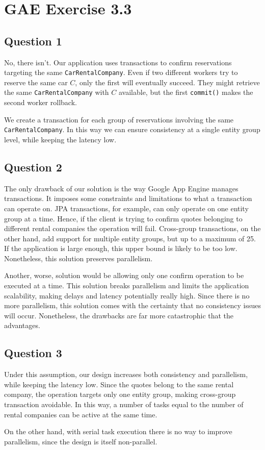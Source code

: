 \section{GAE Exercise 3.3}
\subsection{Question 1}
No, there isn't. Our application uses transactions to confirm reservations targeting the same \texttt{CarRentalCompany}. Even if two different workers try to reserve the same car $C$, only the first will eventually succeed. They might retrieve the same \texttt{CarRentalCompany} with $C$ available, but the first \texttt{commit()} makes the second worker rollback. 

We create a transaction for each group of reservations involving the same \texttt{CarRentalCompany}. In this way we can ensure consistency at a single entity group level, while keeping the latency low.

\subsection{Question 2}
The only drawback of our solution is the way Google App Engine manages transactions. It imposes some constraints and limitations to what a transaction can operate on. JPA transactions, for example, can only operate on one entity group at a time. Hence, if the client is trying to confirm quotes belonging to different rental companies the operation will fail. Cross-group transactions, on the other hand, add support for multiple entity groups, but up to a maximum of 25. If the application is large enough, this upper bound is likely to be too low. Nonetheless, this solution preserves parallelism.

Another, worse, solution would be allowing only one confirm operation to be executed at a time. This solution breaks parallelism and limits the application scalability, making delays and latency potentially really high. Since there is no more parallelism, this solution comes with the certainty that no consistency issues will occur. Nonetheless, the drawbacks are far more catastrophic that the advantages. 

\subsection{Question 3}
Under this assumption, our design increases both consistency and parallelism, while keeping the latency low. Since the quotes belong to the same rental company, the operation targets only one entity group, making cross-group transaction avoidable. In this way, a number of tasks equal to the number of rental companies can be active at the same time.

On the other hand, with serial task execution there is no way to improve parallelism, since the design is itself non-parallel. 

